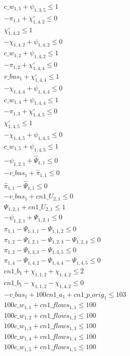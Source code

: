 \documentclass[]{article}
\begin{document}
\begin{align*}
 & c\_w_{1,5} + \psi_{1,3,5} \leq 1\\
 & -\pi_{1,1} + \chi^\circ_{1,4,2} \leq 0\\
 & \chi^\circ_{1,4,2} \leq 1\\
 & -\chi_{1,4,2} + \psi_{1,4,2} \leq 0\\
 & c\_w_{1,2} + \psi_{1,4,2} \leq 1\\
 & -\pi_{1,2} + \chi^\circ_{1,4,4} \leq 0\\
 & v\_bus_{1} + \chi^\circ_{1,4,4} \leq 1\\
 & -\chi_{1,4,4} + \psi_{1,4,4} \leq 0\\
 & c\_w_{1,4} + \psi_{1,4,4} \leq 1\\
 & -\pi_{1,3} + \chi^\circ_{1,4,5} \leq 0\\
 & \chi^\circ_{1,4,5} \leq 1\\
 & -\chi_{1,4,5} + \psi_{1,4,5} \leq 0\\
 & c\_w_{1,5} + \psi_{1,4,5} \leq 1\\
 & -\psi_{1,2,1} + \hat{\Psi}_{1,1} \leq 0\\
 & -v\_bus_{1} + \hat{\pi} _{1,1} \leq 0\\
 & \hat{\pi} _{1,1} - \hat{\Psi}_{1,1} \leq 0\\
 & -v\_bus_{1} + cn1\_U_{2,1} \leq 0\\
 & \Psi_{1,2,1} + cn1\_U_{2,1} \leq 1\\
 & -\psi_{1,2,1} + \Psi_{1,2,1} \leq 0\\
 & \pi_{1,1} - \Psi_{1,1,1} - \Psi_{1,1,2} \leq 0\\
 & \pi_{1,2} - \Psi_{1,2,1} - \Psi_{1,2,3} - \Psi_{1,2,4} \leq 0\\
 & \pi_{1,3} - \Psi_{1,3,3} - \Psi_{1,3,5} \leq 0\\
 & \pi_{1,4} - \Psi_{1,4,2} - \Psi_{1,4,4} - \Psi_{1,4,5} \leq 0\\
 & cn1\_b_{1} + \chi_{1,1,2} + \chi_{1,4,2} \leq 2\\
 & cn1\_b_{1} - \chi_{1,1,2} - \chi_{1,4,2} \leq 0\\
 & -v\_bus_{1} + 100 cn1\_a_{1} + cn1\_p\_orig_{1} \leq 103\\
 & 100 c\_w_{1,1} + cn1\_flows_{1,1} \leq 100\\
 & 100 c\_w_{1,2} + cn1\_flows_{1,2} \leq 100\\
 & 100 c\_w_{1,3} + cn1\_flows_{1,3} \leq 100\\
 & 100 c\_w_{1,4} + cn1\_flows_{1,4} \leq 100\\
 & 100 c\_w_{1,5} + cn1\_flows_{1,5} \leq 100\\

\end{align*}
\end{document}
